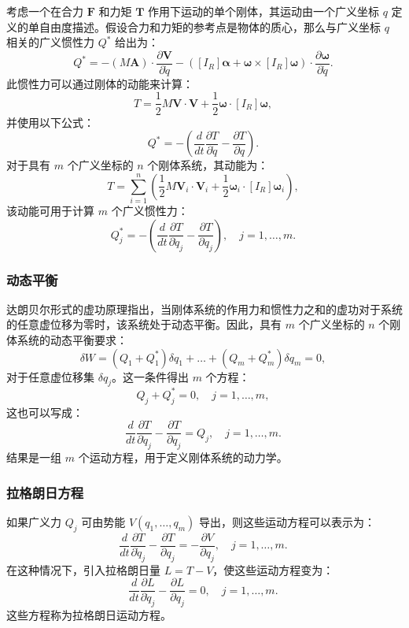 考虑一个在合力 \( \mathbf{F} \) 和力矩 \( \mathbf{T} \) 作用下运动的单个刚体，其运动由一个广义坐标 \( q \) 定义的单自由度描述。假设合力和力矩的参考点是物体的质心，那么与广义坐标 \( q \) 相关的广义惯性力 \( Q^* \) 给出为：
\[
Q^* = - (M \mathbf{A}) \cdot \frac{\partial \mathbf{V}}{\partial \dot{q}} - \left( [I_R] \boldsymbol{\alpha} + \boldsymbol{\omega} \times [I_R] \boldsymbol{\omega} \right) \cdot \frac{\partial \boldsymbol{\omega}}{\partial \dot{q}}.~
\]
此惯性力可以通过刚体的动能来计算：
\[
T = \frac{1}{2} M \mathbf{V} \cdot \mathbf{V} + \frac{1}{2} \boldsymbol{\omega} \cdot [I_R] \boldsymbol{\omega},~
\]
并使用以下公式：
\[
Q^* = - \left( \frac{d}{dt} \frac{\partial T}{\partial \dot{q}} - \frac{\partial T}{\partial q} \right).~
\]
对于具有 \( m \) 个广义坐标的 \( n \) 个刚体系统，其动能为：
\[
T = \sum_{i=1}^{n} \left( \frac{1}{2} M \mathbf{V}_i \cdot \mathbf{V}_i + \frac{1}{2} \boldsymbol{\omega}_i \cdot [I_R] \boldsymbol{\omega}_i \right),~
\]
该动能可用于计算 \( m \) 个广义惯性力：
\[
Q_j^* = - \left( \frac{d}{dt} \frac{\partial T}{\partial \dot{q}_j} - \frac{\partial T}{\partial q_j} \right), \quad j = 1, \dots, m.~
\]
\subsubsection{动态平衡}
达朗贝尔形式的虚功原理指出，当刚体系统的作用力和惯性力之和的虚功对于系统的任意虚位移为零时，该系统处于动态平衡。因此，具有 \( m \) 个广义坐标的 \( n \) 个刚体系统的动态平衡要求：
\[
\delta W = \left(Q_{1} + Q_{1}^{*}\right) \delta q_{1} + \dots + \left(Q_{m} + Q_{m}^{*}\right) \delta q_{m} = 0,~
\]
对于任意虚位移集 \( \delta q_j \)。这一条件得出 \( m \) 个方程：
\[
Q_j + Q_j^* = 0, \quad j = 1, \dots, m,~
\]
这也可以写成：
\[
\frac{d}{dt} \frac{\partial T}{\partial \dot{q}_j} - \frac{\partial T}{\partial q_j} = Q_j, \quad j = 1, \dots, m.~
\]
结果是一组 \( m \) 个运动方程，用于定义刚体系统的动力学。
\subsubsection{拉格朗日方程}
如果广义力 \( Q_j \) 可由势能 \( V(q_1, \dots, q_m) \) 导出，则这些运动方程可以表示为：
\[
\frac{d}{dt} \frac{\partial T}{\partial \dot{q}_j} - \frac{\partial T}{\partial q_j} = -\frac{\partial V}{\partial q_j}, \quad j = 1, \dots, m.~
\]
在这种情况下，引入拉格朗日量 \( L = T - V \)，使这些运动方程变为：
\[
\frac{d}{dt} \frac{\partial L}{\partial \dot{q}_j} - \frac{\partial L}{\partial q_j} = 0, \quad j = 1, \dots, m.~
\]
这些方程称为拉格朗日运动方程。
